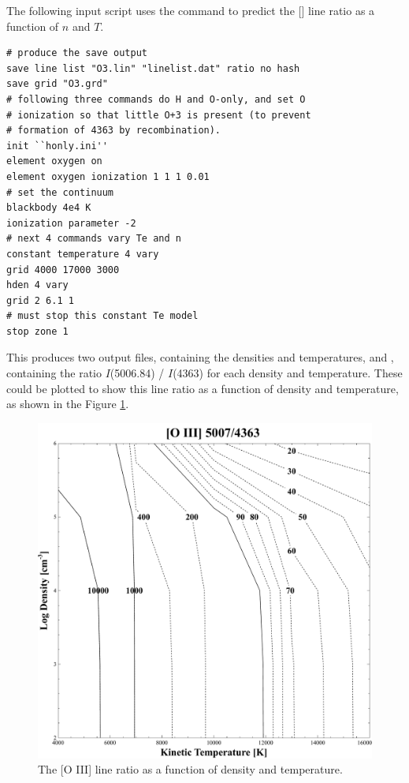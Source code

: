 The following input script
uses the  command to predict the [\oiii] line ratio as a function of
$n$ and $T$.
\begin{verbatim}
# produce the save output
save line list "O3.lin" "linelist.dat" ratio no hash
save grid "O3.grd"
# following three commands do H and O-only, and set O
# ionization so that little O+3 is present (to prevent
# formation of 4363 by recombination).
init ``honly.ini''
element oxygen on
element oxygen ionization 1 1 1 0.01
# set the continuum
blackbody 4e4 K
ionization parameter -2
# next 4 commands vary Te and n
constant temperature 4 vary
grid 4000 17000 3000
hden 4 vary
grid 2 6.1 1
# must stop this constant Te model
stop zone 1
\end{verbatim}
This produces two output files, 
containing the densities and temperatures,
and , containing the ratio $I$(5006.84) / $I$(4363)
for each density and temperature.
These could be plotted to show this line ratio
as a function of density and temperature,
as shown in the Figure \ref{fig:SaveLineRatio}.

\begin{figure}
\centering
\includegraphics[scale=0.4]{SaveLineRatio}
\caption[Save line ratio example]{
\label{fig:SaveLineRatio}
The [O III] line ratio as a function of density and temperature.}
\end{figure}

